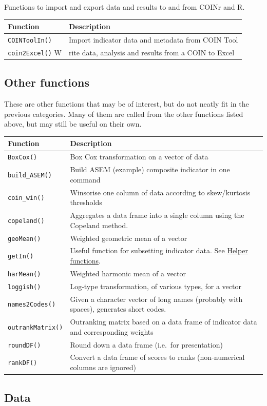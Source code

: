 \documentclass[
]{book}
\begin{document}
Functions to import and export data and results to and from COINr and R.

\begin{longtable}[]{@{}ll@{}}
\toprule
Function & Description\tabularnewline
\midrule
\endhead
\texttt{COINToolIn()} & Import indicator data and metadata from COIN Tool\tabularnewline
\texttt{coin2Excel()} W & rite data, analysis and results from a COIN to Excel\tabularnewline
\bottomrule
\end{longtable}

\hypertarget{other-functions}{%
\subsection{Other functions}\label{other-functions}}

These are other functions that may be of interest, but do not neatly fit in the previous categories. Many of them are called from the other functions listed above, but may still be useful on their own.

\begin{longtable}[]{@{}ll@{}}
\toprule
Function & Description\tabularnewline
\midrule
\endhead
\texttt{BoxCox()} & Box Cox transformation on a vector of data\tabularnewline
\texttt{build\_ASEM()} & Build ASEM (example) composite indicator in one command\tabularnewline
\texttt{coin\_win()} & Winsorise one column of data according to skew/kurtosis thresholds\tabularnewline
\texttt{copeland()} & Aggregates a data frame into a single column using the Copeland method.\tabularnewline
\texttt{geoMean()} & Weighted geometric mean of a vector\tabularnewline
\texttt{getIn()} & Useful function for subsetting indicator data. See \protect\hyperlink{helper-functions}{Helper functions}.\tabularnewline
\texttt{harMean()} & Weighted harmonic mean of a vector\tabularnewline
\texttt{loggish()} & Log-type transformation, of various types, for a vector\tabularnewline
\texttt{names2Codes()} & Given a character vector of long names (probably with spaces), generates short codes.\tabularnewline
\texttt{outrankMatrix()} & Outranking matrix based on a data frame of indicator data and corresponding weights\tabularnewline
\texttt{roundDF()} & Round down a data frame (i.e.~for presentation)\tabularnewline
\texttt{rankDF()} & Convert a data frame of scores to ranks (non-numerical columns are ignored)\tabularnewline
\bottomrule
\end{longtable}

\hypertarget{data}{%
\subsection{Data}\label{data}}
\end{document}
